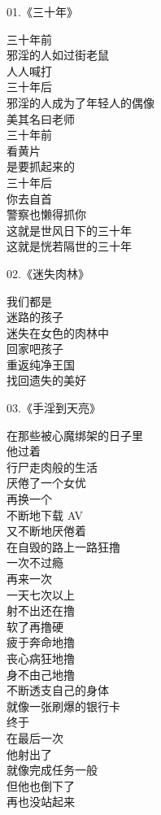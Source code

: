 \begin{multicols}{2}
    \begin{center}
        01.《三十年》\it

        三十年前 \\ 邪淫的人如过街老鼠 \\ 人人喊打
        ~\\
        三十年后 \\ 邪淫的人成为了年轻人的偶像 \\ 美其名曰老师
        ~\\
        三十年前 \\ 看黄片 \\ 是要抓起来的
        ~\\
        三十年后 \\ 你去自首 \\ 警察也懒得抓你
        ~\\
        这就是世风日下的三十年 \\ 这就是恍若隔世的三十年
    \end{center}

    \begin{center}
        02.《迷失肉林》\it

        我们都是 \\ 迷路的孩子 \\ 迷失在女色的肉林中 \\ 回家吧孩子 \\ 重返纯净王国 \\ 找回遗失的美好
    \end{center}

    \begin{center}
        03.《手淫到天亮》\it

        在那些被心魔绑架的日子里 \\ 他过着 \\ 行尸走肉般的生活 \\ 厌倦了一个女优 \\ 再换一个 \\ 不断地下载 AV \\ 又不断地厌倦着 \\ 在自毁的路上一路狂撸 \\ 一次不过瘾 \\ 再来一次 \\ 一天七次以上 \\ 射不出还在撸 \\ 软了再撸硬 \\ 疲于奔命地撸 \\ 丧心病狂地撸 \\ 身不由己地撸 \\ 不断透支自己的身体 \\ 就像一张刷爆的银行卡 \\ 终于 \\ 在最后一次 \\ 他射出了 \\ 就像完成任务一般 \\ 但他也倒下了 \\ 再也没站起来
    \end{center}


\end{multicols}
